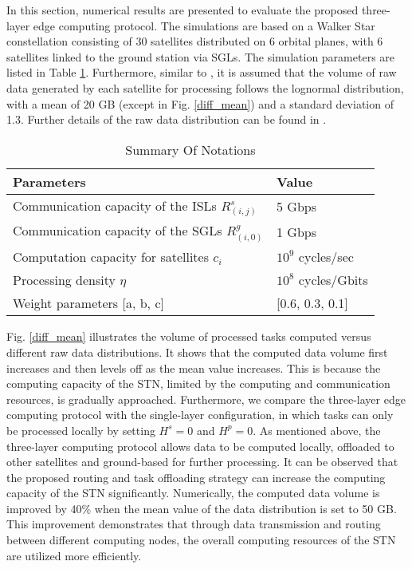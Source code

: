 \documentclass[journal,10pt]{IEEEtran}
\begin{document}
In this section, numerical results are presented to evaluate the proposed three-layer edge computing protocol. The simulations are based on a Walker Star constellation consisting of 30 satellites distributed on 6 orbital planes, with 6 satellites linked to the ground station via SGLs. The simulation parameters are listed in Table \ref{Notation}. Furthermore, similar to \cite{cao2023computing}, it is assumed that the volume of raw data generated by each satellite for processing follows the lognormal distribution, with a mean of 20 GB (except in Fig. \ref{diff_mean}) and a standard deviation of 1.3. Further details of the raw data distribution can be found in \cite{wang2015approach}.

\begin{table}[!t]
\centering
\caption{Summary Of Notations}
\label{Notation}
\begin{tabular}{p{5.2 cm}|l}
\hline
\textbf{Parameters} & \textbf{Value}\\
\hline
Communication capacity of the ISLs $R^s_{(i,j)}$ & 5 Gbps \cite{cao2023computing}\\
Communication capacity of the SGLs $R^g_{(i,0)}$ & 1 Gbps \cite{cao2023computing} \\
Computation capacity for satellites $c_i$ & $10^9$ cycles/sec \\
Processing density $\eta$ & $10^8$ cycles/Gbits \\
Weight parameters [a, b, c] & [0.6, 0.3, 0.1] \\
\hline
\end{tabular}
\vspace{-0.4cm}
\end{table}

Fig. \ref{diff_mean} illustrates the volume of processed tasks computed versus different raw data distributions. It shows that the computed data volume first increases and then levels off as the mean value increases. This is because the computing capacity of the STN, limited by the computing and communication resources, is gradually approached. Furthermore, we compare the three-layer edge computing protocol with the single-layer configuration, in which tasks can only be processed locally by setting $H^s=0$ and $H^p=0$. As mentioned above, the three-layer computing protocol allows data to be computed locally, offloaded to other satellites and ground-based for further processing. It can be observed that the proposed routing and task offloading strategy can increase the computing capacity of the STN significantly. Numerically, the computed data volume is improved by 40\% when the mean value of the data distribution is set to 50 GB. This improvement demonstrates that through data transmission and routing between different computing nodes, the overall computing resources of the STN are utilized more efficiently. 
\end{document}
